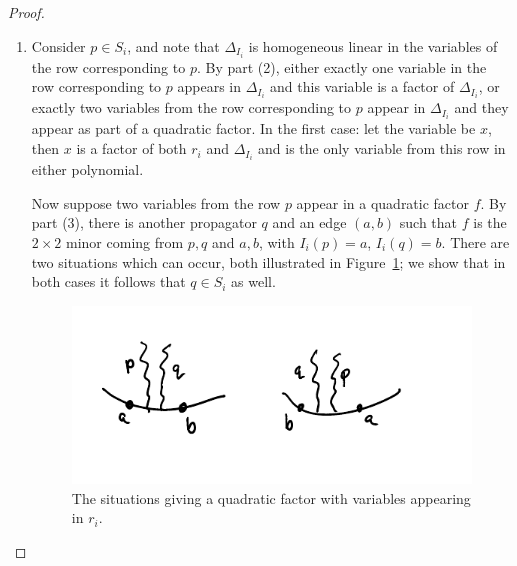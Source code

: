 \documentclass[11pt]{article}
\theoremstyle{remark}
\theoremstyle{definition}
\begin{document}
\begin{proof}
\begin{enumerate}
Now let $f$ be a quadratic factor of $\Delta_{I_i}$.  By part (2) we know that $f$ is a $2\times 2$ minor coming from two propagators, call them $p$ and $q$, and two vertices, call them $a <_i b$.  It remains to show that $a$ and $b$ are adjacent.  From this we can conclude that $p$ and $q$ each have one end on $(a,b)$, as any other way for both $p$ and $q$ to be supported on two consecutive vertices would contradict noncrossing or the density requirement of admissibility.

As in the proof of part (2), make a new admissible diagram by removing the propagators which come before $f$ and set $i=a$.  The cases in the proof of part (2) show how $\Delta_{I_i}$ factors: in particular the vertices supporting the other end of $p$ either do not appear in $I_i$, or they contribute to a different factor of $\Delta_{I_i}$ than $p$ and $a$ do.  By assumption $b$ contributes to the same factor as $a$.  Therefore $(a,b)$ is an edge.

\item Consider $p\in S_i$, and note that $\Delta_{I_i}$ is homogeneous linear in the variables of the row corresponding to $p$.  By part (2), either exactly one variable in the row corresponding to $p$ appears in $\Delta_{I_i}$ and this variable is a factor of $\Delta_{I_i}$, or exactly two variables from the row corresponding to $p$ appear in $\Delta_{I_i}$ and they appear as part of a quadratic factor.  In the first case: let the variable be $x$, then $x$ is a factor of both $r_i$ and $\Delta_{I_i}$ and is the only variable from this row in either polynomial.  

Now suppose two variables from the row $p$ appear in a quadratic factor $f$.  By part (3), there is another propagator $q$ and an edge $(a,b)$ such that $f$ is the $2\times 2$ minor coming from $p, q$ and $a, b$, with $I_i(p)=a$, $I_i(q)=b$.  There are two situations which can occur, both illustrated in Figure~\ref{fig quadratic}; we show that in both cases it follows that $q \in S_i$ as well.

\begin{figure}
  \includegraphics{quadratic}
  \caption{The situations giving a quadratic factor with variables appearing in $r_i$.}\label{fig quadratic}
\end{figure}


\end{enumerate}
\end{proof}
\end{document}
